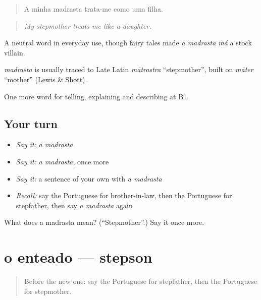 \begin{quote}
A minha madrasta trata-me como uma filha.
\end{quote}

\begin{quote}
\emph{My stepmother treats me like a daughter.}
\end{quote}

A neutral word in everyday use, though fairy tales made \emph{a madrasta má} a stock villain.

\begin{cousinweb}
\emph{madrasta} is usually traced to Late Latin \emph{mātrastra} \textquotedblleft{}stepmother\textquotedblright{}, built on \emph{māter} \textquotedblleft{}mother\textquotedblright{} (Lewis \& Short).
\end{cousinweb}

\begin{grammarlens}[title={What you've built}]
One more word for telling, explaining and describing at B1.
\end{grammarlens}

\subsection*{Your turn}
\begin{itemize}
\raggedright
  \item \emph{Say it:} \emph{a madrasta}
  \item \emph{Say it:} \emph{a madrasta}, once more
  \item \emph{Say it:} a sentence of your own with \emph{a madrasta}
  \item \emph{Recall:} say the Portuguese for brother-in-law, then the Portuguese for stepfather, then say \emph{a madrasta} again
\end{itemize}

\begin{tcolorbox}[breakable,colback=teal!4,colframe=teal!35!black,title={Before you move on}]
What does a madrasta mean? (\textquotedblleft{}Stepmother\textquotedblright{}.) Say it once more.
\end{tcolorbox}
\section[o enteado]{o enteado — stepson}

\label{lesson:PT-C492-enteado}



\begin{quote}
Before the new one: say the Portuguese for stepfather, then the Portuguese for stepmother.
\end{quote}

